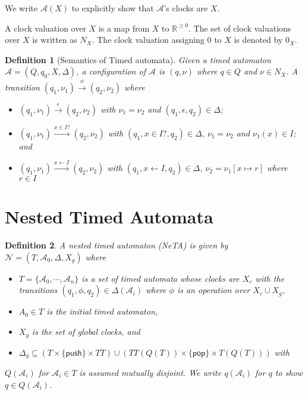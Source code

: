 \documentclass{llncs}
\newtheorem{Def}{Definition}
\newcommand{\nnegreal}{\mathbb{R}^{\geq 0}}
\begin{document}
We write $\mathcal{A}(X)$ to explicitly show that $\mathcal{A}$'s clocks are $X$.

A clock valuation over $X$ is a map from $X$ to $\nnegreal$.   The set of clock valuations over $X$
is written as $N_X$.  The clock valuation assigning 0 to $X$ is denoted by $0_X$.

\begin{Def}[Semantics of Timed automata]
  Given a timed automaton $\mathcal{A}=(Q,q_0,X,\Delta)$, a configuration
  of $\mathcal{A}$ is $(q,\nu)$ where $q\in Q$ and $\nu\in N_X$.
  A transition $(q_1,\nu_1)\xrightarrow{\phi}(q_2,\nu_2)$ where
  \begin{itemize}
    \item $(q_1,\nu_1)\xrightarrow{\epsilon}(q_2,\nu_2)$ with $\nu_1=\nu_2$ and $(q_1,\epsilon,q_2)\in\Delta$;
    \item $(q_1,\nu_1)\xrightarrow{x\in I?}(q_2,\nu_2)$ with $(q_1,x\in I?,q_2)\in\Delta$, $\nu_1=\nu_2$ and $\nu_1(x)\in I$; and
    \item $(q_1,\nu_1)\xrightarrow{x\leftarrow I}(q_2,\nu_2)$ with $(q_1,x\leftarrow I,q_2)\in\Delta$, $\nu_2=\nu_1[x\mapsto r]$ where $r\in I$
  \end{itemize}
\end{Def}

\section{Nested Timed Automata}

\begin{Def}
  A nested timed automaton (NeTA) is given by $\mathcal{N}=(T,\mathcal{A}_0,\Delta,X_g)$ where
  \begin{itemize}
    \item $T=\{\mathcal{A}_0,\cdots,\mathcal{A}_n\}$ is a set of timed automata whose clocks are $X_c$ with
    the transitions $(q_1,\phi,q_2)\in\Delta(\mathcal{A}_i)$ where $\phi$ is an operation over $X_c\cup X_g$,
    \item $A_0\in T$ is the initial timed automaton,
    \item $X_g$ is the set of global clocks, and
    \item $\Delta_g\subseteq (T\times\{\mathsf{push}\}\times TT)\cup(TT(Q(T))\times\{\mathsf{pop}\}\times T(Q(T)))$ with
  \end{itemize}
  $Q(\mathcal{A}_i)$ for $\mathcal{A}_i\in T$ is assumed mutually disjoint.  We write $q(\mathcal{A}_i)$ for $q$ to show $q\in Q(\mathcal{A}_i)$. 
\end{Def}
\end{document}
